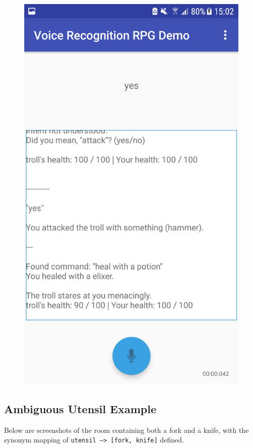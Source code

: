 \documentclass[11pt]{article}
\begin{document}
\begin{appendices}
\begin{center}
\begin{figure}[H]
\begin{center}
  \includegraphics[scale=0.25]{Screenshot_20180527-150225.png}
  \label{fig:snapshot-multiple-command-2}
  \end{center}
\end{figure}
\end{center}

\newpage
\subsection{Ambiguous Utensil Example}
\label{appendix:utensil}
Below are screenshots of the room containing both a fork and a knife, with the synonym mapping of \texttt{utensil --> [fork, knife]} defined.


\end{appendices}
\end{document}
